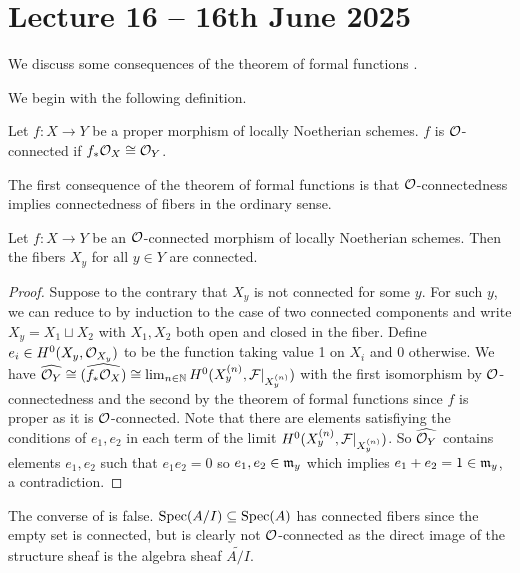 \section{Lecture 16 -- 16th June 2025}\label{sec: lecture 16}
We discuss some consequences of the theorem of formal functions . 

We begin with the following definition. 
\begin{definition}\label{def: O-connected}
    Let $f:X\to Y$ be a proper morphism of locally Noetherian schemes. $f$ is $\mathcal{O}$-connected if $f_{*}\mathcal{O}_{X}\cong\mathcal{O}_{Y}$. 
\end{definition}
The first consequence of the theorem of formal functions is that $\mathcal{O}$-connectedness implies connectedness of fibers in the ordinary sense. 
\begin{proposition}\label{prop: O-connected implies connected fibers}
    Let $f:X\to Y$ be an $\mathcal{O}$-connected morphism of locally Noetherian schemes. Then the fibers $X_{y}$ for all $y\in Y$ are connected. 
\end{proposition}
\begin{proof}
    Suppose to the contrary that $X_{y}$ is not connected for some $y$. For such $y$, we can reduce to by induction to the case of two connected components and write $X_{y}=X_{1}\sqcup X_{2}$ with $X_{1},X_{2}$ both open and closed in the fiber. Define $e_{i}\in H^{0}(X_{y},\mathcal{O}_{X_{y}})$ to be the function taking value 1 on $X_{i}$ and 0 otherwise. We have $\widehat{\mathcal{O}_{Y}}\cong\widehat{(f_{*}\mathcal{O}_{X})}\cong\lim_{n\in\mathbb{N}}H^{0}(X_{y}^{(n)},\mathcal{F}|_{X_{y}^{(n)}})$ with the first isomorphism by $\mathcal{O}$-connectedness and the second by the theorem of formal functions  since $f$ is proper as it is $\mathcal{O}$-connected. Note that there are elements satisfiying the conditions of $e_{1},e_{2}$ in each term of the limit $H^{0}(X_{y}^{(n)},\mathcal{F}|_{X_{y}^{(n)}})$. So $\widehat{\mathcal{O}_{Y}}$ contains elements $e_{1},e_{2}$ such that $e_{1}e_{2}=0$ so $e_{1},e_{2}\in\mathfrak{m}_{y}$ which implies $e_{1}+e_{2}=1\in\mathfrak{m}_{y}$, a contradiction. 
\end{proof}
\begin{remark}
    The converse of  is false. $\operatorname{Spec}(A/I)\subseteq\operatorname{Spec}(A)$ has connected fibers since the empty set is connected, but is clearly not $\mathcal{O}$-connected as the direct image of the structure sheaf is the algebra sheaf $\widetilde{A/I}$. 
\end{remark}
